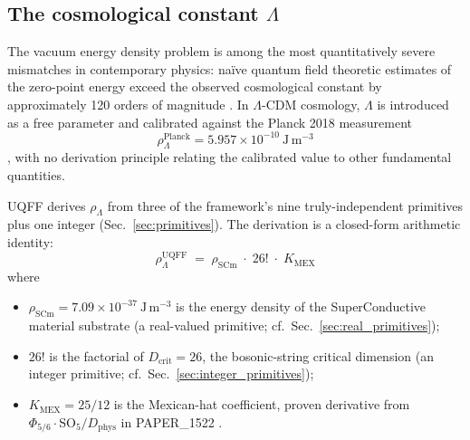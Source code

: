 
\subsection{The cosmological constant $\Lambda$}
\label{sec:lambda}

The vacuum energy density problem is among the most quantitatively severe
mismatches in contemporary physics: na\"ive quantum field theoretic
estimates of the zero-point energy exceed the observed cosmological
constant by approximately 120 orders of magnitude
\cite{Weinberg1989, Martin2012}. In $\Lambda$-CDM cosmology, $\Lambda$ is
introduced as a free parameter and calibrated against the Planck 2018
measurement
\begin{equation}
\rho_\Lambda^{\text{Planck}} = 5.957 \times 10^{-10}\ \mathrm{J\,m^{-3}}
\label{eq:lambda_planck}
\end{equation}
\cite{Planck2018}, with no derivation principle relating the calibrated
value to other fundamental quantities.

UQFF derives $\rho_\Lambda$ from three of the framework's nine
truly-independent primitives plus one integer (Sec.~\ref{sec:primitives}).
The derivation is a closed-form arithmetic identity:
\begin{equation}
\boxed{\;
\rho_\Lambda^{\text{UQFF}} \;=\; \rho_{\text{SCm}}\;\cdot\;26!\;\cdot\;K_{\text{MEX}}
\;}
\label{eq:lambda_uqff}
\end{equation}
where
\begin{itemize}
  \item $\rho_{\text{SCm}} = 7.09\times 10^{-37}\ \mathrm{J\,m^{-3}}$
        is the energy density of the SuperConductive material substrate
        (a real-valued primitive; cf.~Sec.~\ref{sec:real_primitives});
  \item $26!$ is the factorial of $D_{\text{crit}}=26$, the bosonic-string
        critical dimension (an integer primitive; cf.~Sec.~\ref{sec:integer_primitives});
  \item $K_{\text{MEX}} = 25/12$ is the Mexican-hat coefficient,
        proven derivative from $\Phi_{5/6}\cdot \mathrm{SO}_5 / D_{\text{phys}}$
        in PAPER\_1522 \cite{Murphy_PAPER_1522}.
\end{itemize}

